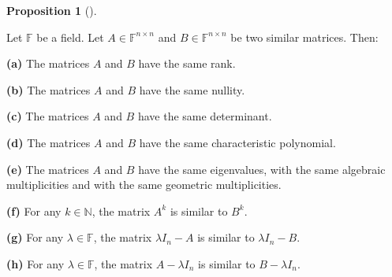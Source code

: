 \documentclass[numbers=enddot,12pt,final,onecolumn,notitlepage]{scrartcl}%
\numberwithin{exer}{subsection}
\theoremstyle{definition}
\newtheorem{prop}[theo]{Proposition}
\newenvironment{proposition}[1][]
{\begin{prop}[#1]\begin{leftbar}}
{\end{leftbar}\end{prop}}
\begin{document}
\begin{proposition}
\label{prop.schurtri.similar.same}Let $\mathbb{F}$ be a field. Let
$A\in\mathbb{F}^{n\times n}$ and $B\in\mathbb{F}^{n\times n}$ be two similar
matrices. Then: \medskip

\textbf{(a)} The matrices $A$ and $B$ have the same rank. \medskip

\textbf{(b)} The matrices $A$ and $B$ have the same nullity. \medskip

\textbf{(c)} The matrices $A$ and $B$ have the same determinant. \medskip

\textbf{(d)} The matrices $A$ and $B$ have the same characteristic polynomial.
\medskip

\textbf{(e)} The matrices $A$ and $B$ have the same eigenvalues, with the same
algebraic multiplicities and with the same geometric multiplicities. \medskip

\textbf{(f)} For any $k\in\mathbb{N}$, the matrix $A^{k}$ is similar to
$B^{k}$. \medskip

\textbf{(g)} For any $\lambda\in\mathbb{F}$, the matrix $\lambda I_{n}-A$ is
similar to $\lambda I_{n}-B$.\medskip

\textbf{(h)} For any $\lambda\in\mathbb{F}$, the matrix $A-\lambda I_{n}$ is
similar to $B-\lambda I_{n}$.
\end{proposition}
\end{document}
